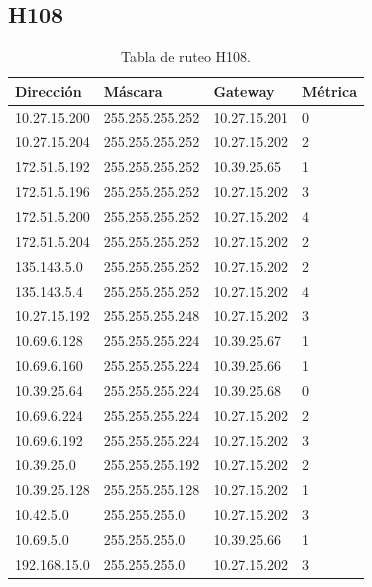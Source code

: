 \documentclass[12pt,titlepage]{article}
\begin{document}
\subsection{H108}
\begin{table}
  \begin{center}
    \begin{tabular}{|l|l|l|l|}
      \hline
        \bf{Direcci\'on} & \bf{M\'ascara} & \bf{Gateway} & \bf{M\'etrica} \\
      \hline 
	10.27.15.200  & 255.255.255.252 & 10.27.15.201 & 0 \\
        10.27.15.204  & 255.255.255.252 & 10.27.15.202 & 2 \\
        172.51.5.192  & 255.255.255.252 & 10.39.25.65 & 1 \\
        172.51.5.196  & 255.255.255.252 & 10.27.15.202 & 3 \\
        172.51.5.200  & 255.255.255.252 & 10.27.15.202 & 4 \\
        172.51.5.204  & 255.255.255.252 & 10.27.15.202 & 2 \\
        135.143.5.0   & 255.255.255.252 & 10.27.15.202 & 2 \\
        135.143.5.4   & 255.255.255.252 & 10.27.15.202 & 4 \\ 	
	10.27.15.192  & 255.255.255.248 & 10.27.15.202 & 3 \\
	10.69.6.128   & 255.255.255.224 & 10.39.25.67 & 1 \\
        10.69.6.160   & 255.255.255.224 & 10.39.25.66 & 1 \\
	10.39.25.64   & 255.255.255.224 & 10.39.25.68 & 0 \\       
	10.69.6.224   & 255.255.255.224 & 10.27.15.202 & 2 \\
	10.69.6.192   & 255.255.255.224 & 10.27.15.202 & 3 \\	
	10.39.25.0    & 255.255.255.192 & 10.27.15.202 & 2 \\
	10.39.25.128  & 255.255.255.128 & 10.27.15.202 & 1 \\
	10.42.5.0     & 255.255.255.0 & 10.27.15.202 & 3 \\
        10.69.5.0     & 255.255.255.0 & 10.39.25.66 & 1 \\
        192.168.15.0  & 255.255.255.0 & 10.27.15.202 & 3 \\  
    \hline
    \end{tabular} \\
  \end{center}
  \caption{Tabla de ruteo H108.}
\end{table}
\newpage
\end{document}
